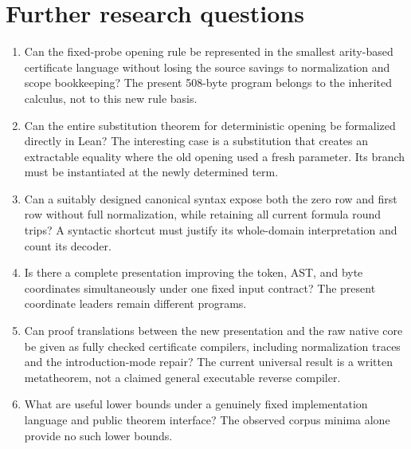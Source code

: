 \section{Further research questions}

\begin{enumerate}
\item Can the fixed-probe opening rule be represented in the smallest
arity-based certificate language without losing the source savings to
normalization and scope bookkeeping?  The present 508-byte program belongs
to the inherited calculus, not to this new rule basis.
\item Can the entire substitution theorem for deterministic opening be
formalized directly in Lean?  The interesting case is a substitution that
creates an extractable equality where the old opening used a fresh
parameter.  Its branch must be instantiated at the newly determined term.
\item Can a suitably designed canonical syntax expose both the zero row
and first row without full normalization, while retaining all current
formula round trips?  A syntactic shortcut must justify its whole-domain
interpretation and count its decoder.
\item Is there a complete presentation improving the token, AST, and byte
coordinates simultaneously under one fixed input contract?  The present
coordinate leaders remain different programs.
\item Can proof translations between the new presentation and the raw
native core be given as fully checked certificate compilers, including
normalization traces and the introduction-mode repair?  The current
universal result is a written metatheorem, not a claimed general executable
reverse compiler.
\item What are useful lower bounds under a genuinely fixed implementation
language and public theorem interface?  The observed corpus minima alone
provide no such lower bounds.
\end{enumerate}

